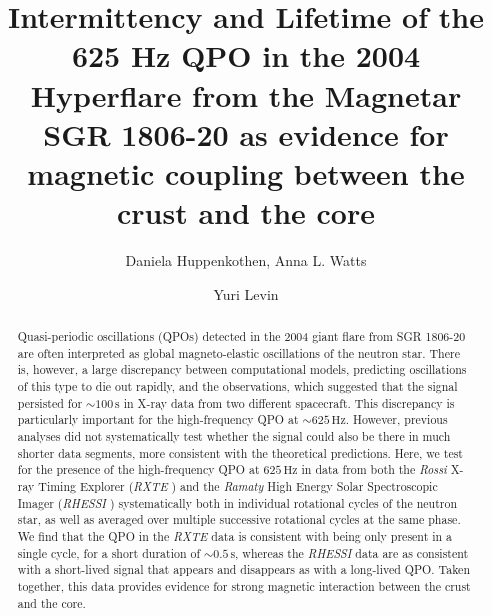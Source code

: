 \documentclass{emulateapj}
\begin{document}
\newcommand{\rxte}{{\it RXTE }}
\newcommand{\rhessi}{{\it RHESSI }}
\newcommand{\hz}{\,\mathrm{Hz}}

\title{Intermittency and Lifetime of the 625 Hz QPO in the 2004 Hyperflare from the Magnetar SGR 1806-20 as evidence for magnetic coupling between the crust and the core}
\author{Daniela Huppenkothen, Anna L. Watts}
\author{Yuri Levin}

\begin{abstract}
Quasi-periodic oscillations (QPOs) detected in the 2004 giant flare from SGR 1806-20 are often interpreted as global magneto-elastic oscillations of the neutron star. There is, however, a large discrepancy between computational models, predicting oscillations of this type to die out rapidly, and the observations, which suggested that the signal persisted for $\sim 100\,\mathrm{s}$ in X-ray data from two different spacecraft. This discrepancy is particularly important for the high-frequency QPO at $\sim 625 \hz$. However, previous analyses did not systematically test whether the signal could also be there in much shorter data segments, more consistent with the theoretical predictions. Here, we test for the presence of the high-frequency QPO at $625 \hz$ in data from both the {\it Rossi } X-ray Timing Explorer (\rxte) and the {\it Ramaty} High Energy Solar Spectroscopic Imager (\rhessi) systematically both in individual rotational cycles of the neutron star, as well as averaged over multiple successive rotational cycles at the same phase. We find that the QPO in the \rxte data is consistent with being only present in a single cycle, for a short duration of $\sim 0.5 \,\mathrm{s}$, whereas the \rhessi data are as consistent with a short-lived signal that appears and disappears as with a long-lived QPO. Taken together, this data provides evidence for strong magnetic interaction between the crust and the core.


\end{abstract} 

\end{document}
